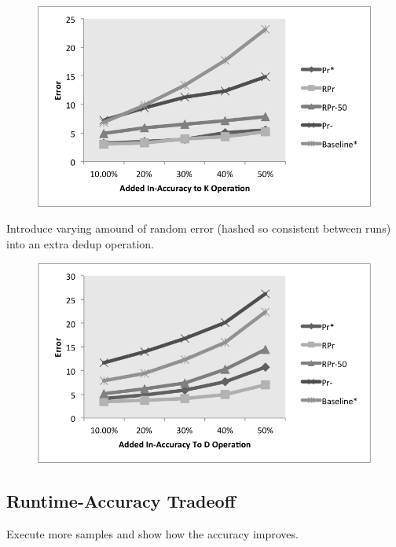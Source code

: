 \begin{figure}[t]\vspace{-1.8em}
\centering
\includegraphics[scale=0.5]{fig2.png}
\caption{}
\label{exp:ms-academic-ranking}
\end{figure}

Introduce varying amound of random error (hashed so consistent between runs) into an extra dedup operation.

\begin{figure}[t]\vspace{-1.8em}
\centering
\includegraphics[scale=0.5]{fig3.png}
\caption{}
\label{exp:ms-academic-ranking}
\end{figure}

\subsection{Runtime-Accuracy Tradeoff}
Execute more samples and show how the accuracy improves.

